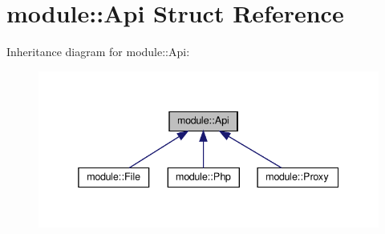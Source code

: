 \hypertarget{structmodule_1_1Api}{}\section{module\+:\+:Api Struct Reference}
\label{structmodule_1_1Api}


Inheritance diagram for module\+:\+:Api\+:
\nopagebreak
\begin{figure}[H]
\begin{center}
\leavevmode
\includegraphics[width=338pt]{structmodule_1_1Api__inherit__graph}
\end{center}
\end{figure}
